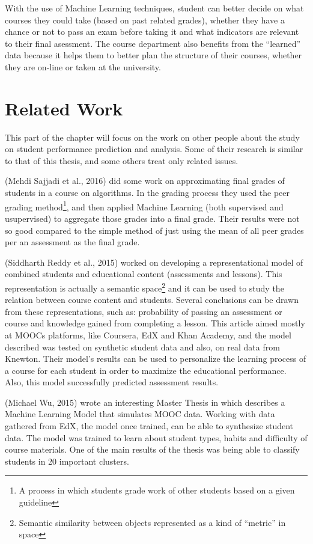 With the use of Machine Learning techniques, student can better decide on what courses 
they could take (based on past related grades), whether they have a chance or not to 
pass an exam before taking it and what indicators are relevant to their final asessment. 
The course department also benefits from the ``learned'' data because it helps them 
to better plan the structure of their courses, whether they are on-line or taken at 
the university.

\section{Related Work}

This part of the chapter will focus on the work on other people about the study 
on student performance prediction and analysis. Some of their research is similar 
to that of this thesis, and some others treat only related issues. 

(Mehdi Sajjadi et al., 2016)\cite{bibl_1} did some work on approximating final grades 
of students in a course on algorithms. In the grading process they used the peer 
grading method\footnote{A process in which students grade work of other students 
based on a given guideline}, and then applied Machine Learning (both supervised and 
usupervised) to aggregate those grades into a final grade. Their results were 
not so good compared to the simple method of just using the mean of all peer grades 
per an assessment as the final grade. 

(Siddharth Reddy et al., 2015)\cite{bibl_2} worked on developing a representational 
model of combined students and educational content (assessments and lessons). 
This representation is actually a semantic space\footnote{Semantic similarity 
between objects represented as a kind of ``metric'' in space} and it can be used 
to study the relation between course content and students. Several conclusions can 
be drawn from these representations, such as: probability of passing an assessment 
or course and knowledge gained from completing a lesson. This article aimed mostly 
at MOOCs platforms, like Coursera, EdX and Khan Academy, and the model described 
was tested on synthetic student data and also, on real data from Knewton.
Their model's results can be used to personalize the learning process of a course 
for each student in order to maximize the educational performance. Also, this 
model successfully predicted assessment results.

(Michael Wu, 2015)\cite{bibl_2_1} wrote an interesting Master Thesis in which 
describes a Machine Learning Model that simulates MOOC data. Working with data 
gathered from EdX, the model once trained, can be able to synthesize student data.
The model was trained to learn about student types, habits and difficulty of course 
materials. One of the main results of the thesis was being able to classify 
students in 20 important clusters.

